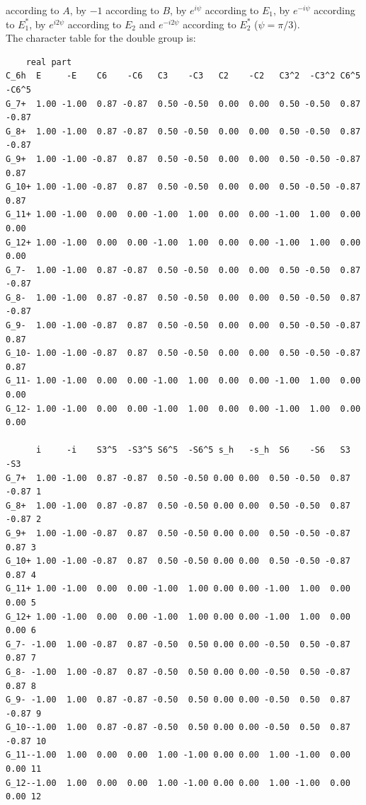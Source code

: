 \documentclass[12pt,a4paper]{article}
\begin{document}
according to $A$, by $-1$ according to $B$, by $e^{i\psi}$ according to
$E_1$, by $e^{-i\psi}$ according to $E_1^*$, by $e^{i2 \psi}$ according to
$E_2$ and $e^{-i2 \psi}$ according to $E_2^*$ ($\psi=\pi/3$). \\
The character table for the double group is:
\begin{verbatim}
    real part
C_6h  E     -E    C6    -C6   C3    -C3   C2    -C2   C3^2  -C3^2 C6^5  -C6^5
G_7+  1.00 -1.00  0.87 -0.87  0.50 -0.50  0.00  0.00  0.50 -0.50  0.87 -0.87
G_8+  1.00 -1.00  0.87 -0.87  0.50 -0.50  0.00  0.00  0.50 -0.50  0.87 -0.87
G_9+  1.00 -1.00 -0.87  0.87  0.50 -0.50  0.00  0.00  0.50 -0.50 -0.87  0.87
G_10+ 1.00 -1.00 -0.87  0.87  0.50 -0.50  0.00  0.00  0.50 -0.50 -0.87  0.87
G_11+ 1.00 -1.00  0.00  0.00 -1.00  1.00  0.00  0.00 -1.00  1.00  0.00  0.00
G_12+ 1.00 -1.00  0.00  0.00 -1.00  1.00  0.00  0.00 -1.00  1.00  0.00  0.00
G_7-  1.00 -1.00  0.87 -0.87  0.50 -0.50  0.00  0.00  0.50 -0.50  0.87 -0.87
G_8-  1.00 -1.00  0.87 -0.87  0.50 -0.50  0.00  0.00  0.50 -0.50  0.87 -0.87
G_9-  1.00 -1.00 -0.87  0.87  0.50 -0.50  0.00  0.00  0.50 -0.50 -0.87  0.87
G_10- 1.00 -1.00 -0.87  0.87  0.50 -0.50  0.00  0.00  0.50 -0.50 -0.87  0.87
G_11- 1.00 -1.00  0.00  0.00 -1.00  1.00  0.00  0.00 -1.00  1.00  0.00  0.00
G_12- 1.00 -1.00  0.00  0.00 -1.00  1.00  0.00  0.00 -1.00  1.00  0.00  0.00

      i     -i    S3^5  -S3^5 S6^5  -S6^5 s_h   -s_h  S6    -S6   S3    -S3
G_7+  1.00 -1.00  0.87 -0.87  0.50 -0.50 0.00 0.00  0.50 -0.50  0.87 -0.87 1
G_8+  1.00 -1.00  0.87 -0.87  0.50 -0.50 0.00 0.00  0.50 -0.50  0.87 -0.87 2
G_9+  1.00 -1.00 -0.87  0.87  0.50 -0.50 0.00 0.00  0.50 -0.50 -0.87  0.87 3
G_10+ 1.00 -1.00 -0.87  0.87  0.50 -0.50 0.00 0.00  0.50 -0.50 -0.87  0.87 4
G_11+ 1.00 -1.00  0.00  0.00 -1.00  1.00 0.00 0.00 -1.00  1.00  0.00  0.00 5
G_12+ 1.00 -1.00  0.00  0.00 -1.00  1.00 0.00 0.00 -1.00  1.00  0.00  0.00 6
G_7- -1.00  1.00 -0.87  0.87 -0.50  0.50 0.00 0.00 -0.50  0.50 -0.87  0.87 7
G_8- -1.00  1.00 -0.87  0.87 -0.50  0.50 0.00 0.00 -0.50  0.50 -0.87  0.87 8
G_9- -1.00  1.00  0.87 -0.87 -0.50  0.50 0.00 0.00 -0.50  0.50  0.87 -0.87 9
G_10--1.00  1.00  0.87 -0.87 -0.50  0.50 0.00 0.00 -0.50  0.50  0.87 -0.87 10
G_11--1.00  1.00  0.00  0.00  1.00 -1.00 0.00 0.00  1.00 -1.00  0.00  0.00 11
G_12--1.00  1.00  0.00  0.00  1.00 -1.00 0.00 0.00  1.00 -1.00  0.00  0.00 12


\end{verbatim}
\end{document}
